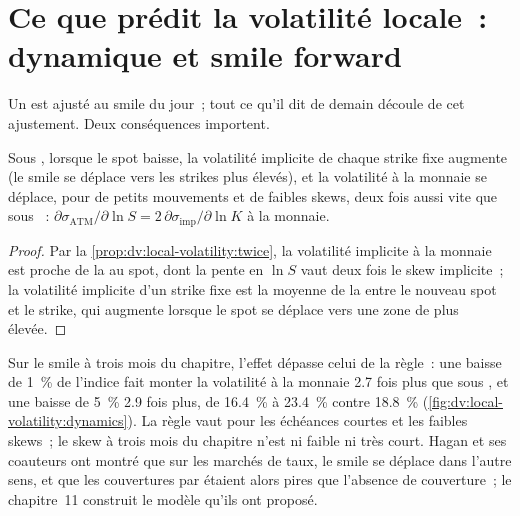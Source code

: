 \section{Ce que prédit la volatilité locale~: dynamique et smile forward}

Un  est ajusté au smile du jour~; tout ce qu'il dit de demain découle de
cet ajustement. Deux conséquences importent.

\begin{proposition}\label{prop:dv:local-volatility:dynamics}
Sous , lorsque le spot baisse, la volatilité implicite de chaque strike fixe augmente (le smile
se déplace vers les strikes plus élevés), et la volatilité à la monnaie se déplace, pour de petits mouvements et de faibles skews, deux fois
aussi vite que sous ~: $\partial\sigma_{\mathrm{ATM}}/\partial\ln S=2\,\partial\sigma_{\mathrm{imp}}
/\partial\ln K$ à la monnaie.
\end{proposition}
\begin{proof}
Par la \cref{prop:dv:local-volatility:twice}, la volatilité implicite à la monnaie est proche de la 
au spot, dont la pente en $\ln S$ vaut deux fois le skew implicite~; la volatilité implicite d'un strike fixe
est la moyenne de la  entre le nouveau spot et le strike, qui augmente lorsque le spot se déplace vers
une zone de  plus élevée.
\end{proof}

Sur le smile à trois mois du chapitre, l'effet dépasse celui de la règle~: une baisse de 1~\% de l'indice fait monter
la volatilité à la monnaie 2.7 fois plus que sous , et une baisse de 5~\% 2.9 fois plus, de 16.4~\% à
23.4~\% contre 18.8~\% (\cref{fig:dv:local-volatility:dynamics}). La règle vaut pour les échéances courtes et les faibles
skews~; le skew à trois mois du chapitre n'est ni faible ni très court. Hagan et ses coauteurs ont montré que sur
les marchés de taux, le smile se déplace dans l'autre sens, et que les couvertures par  étaient alors pires que
l'absence de couverture~; le chapitre~11 construit le modèle qu'ils ont proposé.

